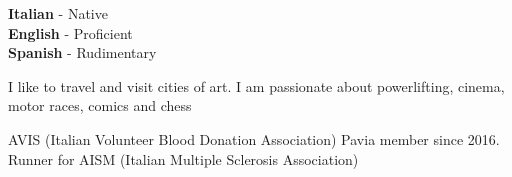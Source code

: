 \documentclass[9pt]{developercv} %
\begin{document}
\begin{entrylist}
		{}
		{}
\end{entrylist}


\begin{minipage}[t]{0.3\textwidth}
	\vspace{-\baselineskip} %

	
	\textbf{Italian} - Native\\
	\textbf{English} - Proficient\\
	\textbf{Spanish} - Rudimentary
\end{minipage}
\hfill
\begin{minipage}[t]{0.3\textwidth}
	\vspace{-\baselineskip} %
	
	
	I like to travel and visit cities of art. I am passionate about powerlifting, cinema, motor races, comics and chess
\end{minipage}
\hfill
\begin{minipage}[t]{0.3\textwidth}
	\vspace{-\baselineskip} %
	
	
	AVIS (Italian Volunteer Blood Donation Association) Pavia member since 2016. Runner for AISM (Italian Multiple Sclerosis Association)
\end{minipage}

\end{document}
